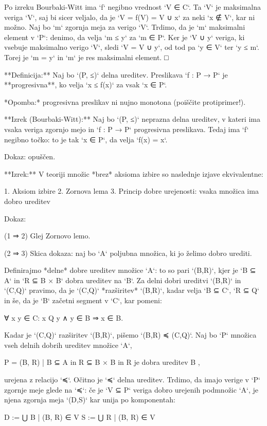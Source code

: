 Po izreku Bourbaki-Witt ima `f` negibno vrednost `V ∈ C`. Ta `V` je maksimalna
veriga `V`, saj bi sicer veljalo, da je `V = f(V) = V ∪ {x}` za neki `x ∉ V`,
kar ni možno. Naj bo `m` zgornja meja za verigo `V`. Trdimo, da je `m`
maksimalni element v `P`: denimo, da velja `m ≤ y` za `m ∈ P`. Ker je `V ∪ {y}`
veriga, ki vsebuje maksimalno verigo `V`, sledi `V = V ∪ {y}`, od tod pa `y ∈ V`
ter `y ≤ m`. Torej je `m = y` in `m` je res maksimalni element. □

**Definicija:** Naj bo `(P, ≤)` delna ureditev. Preslikava `f : P → P` je **progresivna**, ko
velja `x ≤ f(x)` za vsak `x ∈ P`.

*Opomba:* progresivna preslikav ni nujno monotona (poiščite protiprimer!).

**Izrek (Bourbaki-Witt):** Naj bo `(P, ≤)` neprazna delna ureditev, v kateri ima
vsaka veriga zgornjo mejo in `f : P → P` progresivna preslikava. Tedaj ima `f`
negibno točko: to je tak `x ∈ P`, da velja `f(x) = x`.

Dokaz: opuščen.

**Izrek:** V teoriji množic *brez* aksioma izbire so naslednje izjave ekvivalentne:

1. Aksiom izbire
2. Zornova lema
3. Princip dobre urejenosti: vsaka množica ima dobro ureditev

Dokaz:

(1 ⇒ 2) Glej Zornovo lemo.

(2 ⇒ 3) Skica dokaza: naj bo `A` poljubna množica, ki jo želimo dobro urediti.

Definirajmo *delne* dobre ureditev množice `A`: to so pari `(B,R)`, kjer je `B ⊆ A`
in `R ⊆ B × B` dobra ureditev na `B`. Za delni dobri ureditvi `(B,R)` in
`(C,Q)` pravimo, da je `(C,Q)` *razširitev* `(B,R)`, kadar velja `B ⊆ C`, `R ⊆ Q` in
še, da je `B` začetni segment v `C`, kar pomeni:

     ∀ x y ∈ C: x Q y ∧ y ∈ B ⇒ x ∈ B.

Kadar je `(C,Q)` razširitev `(B,R)`, pišemo `(B,R) ≼ (C,Q)`. Naj bo `P` množica vseh delnih
dobrih ureditev množice `A`,

    P = { (B, R) | B ⊆ A in R ⊆ B × B in R je dobra ureditev B },

urejena z relacijo `≼`. Očitno je `≼` delna ureditev. Trdimo, da imajo verige v
`P` zgornje meje glede na `≼`: če je `V ⊆ P` veriga dobro urejenih podmnožic
`A`, je njena zgornja meja `(D,S)` kar unija po komponentah:

     D := ⋃ {B | (B, R) ∈ V}
     S := ⋃ {R | (B, R) ∈ V}

